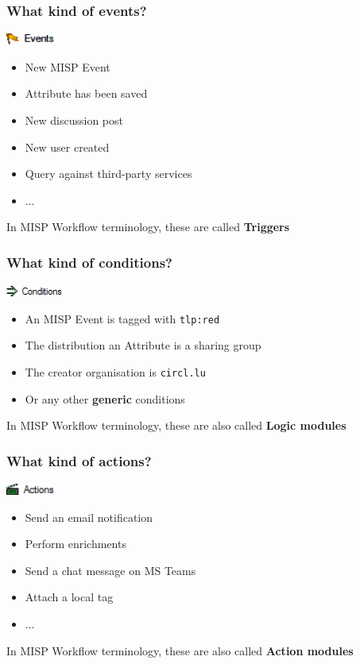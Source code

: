 \begin{frame}
    \frametitle{What kind of events?}
    \includegraphics[width=60px]{pictures/sc-event.png}
    \vspace*{0.5em}
    \begin{itemize}
        \item New MISP Event
        \item Attribute has been saved
        \item New discussion post
        \item New user created
        \item Query against third-party services
        \item ...
    \end{itemize}
    \vspace*{1em}
    In MISP Workflow terminology, these are called \textbf{Triggers}
\end{frame}

\begin{frame}
    \frametitle{What kind of conditions?}
    \includegraphics[width=70px]{pictures/sc-condition.png}
    \vspace*{0.5em}
    \begin{itemize}
        \item An MISP Event is tagged with \texttt{tlp:red}
        \item The distribution an Attribute is a sharing group
        \item The creator organisation is \texttt{circl.lu}
        \item Or any other \textbf{generic} conditions
    \end{itemize}

    \vspace*{1em}
    In MISP Workflow terminology, these are also called \textbf{Logic modules}
\end{frame}

\begin{frame}
    \frametitle{What kind of actions?}
    \includegraphics[width=60px]{pictures/sc-action.png}
    \vspace*{0.5em}
    \begin{itemize}
        \item Send an email notification
        \item Perform enrichments
        \item Send a chat message on MS Teams
        \item Attach a local tag
        \item ...
    \end{itemize}

    \vspace*{1em}
    In MISP Workflow terminology, these are also called \textbf{Action modules}
\end{frame}


